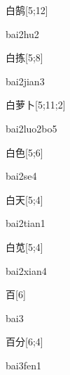 \begin{verbete}[bai2hu2]{白鹄}[5;12]
\begin{pronuncia}{bai2hu2}
\end{pronuncia}
\end{verbete}

\begin{verbete}{白拣}[5;8]
\begin{pronuncia}{bai2jian3}
\end{pronuncia}
\end{verbete}

\begin{verbete}{白萝卜}[5;11;2]
\begin{pronuncia}{bai2luo2bo5}
\end{pronuncia}
\end{verbete}

\begin{verbete}[bai2se4]{白色}[5;6]
\begin{pronuncia}{bai2se4}
\end{pronuncia}
\end{verbete}

\begin{verbete}{白天}[5;4]
\begin{pronuncia}{bai2tian1}
\end{pronuncia}
\end{verbete}

\begin{verbete}{白苋}[5;4]
\begin{pronuncia}{bai2xian4}
\end{pronuncia}
\end{verbete}

\begin{verbete}[bai3]{百}[6]
\begin{pronuncia}{bai3}
\end{pronuncia}
\end{verbete}

\begin{verbete}{百分}[6;4]
\begin{pronuncia}{bai3fen1}
\end{pronuncia}
\end{verbete}

